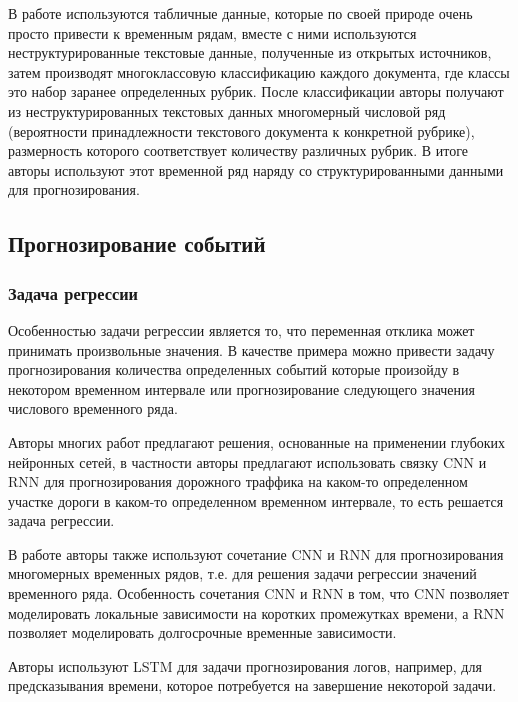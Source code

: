 В работе \cite{struct_unstruct_prediction} используются табличные данные, которые по своей природе очень просто привести к временным рядам, вместе с ними используются неструктурированные текстовые данные, полученные из открытых источников, затем производят многоклассовую классификацию каждого документа, где классы это набор заранее определенных рубрик. После классификации авторы получают из неструктурированных текстовых данных многомерный числовой ряд (вероятности принадлежности текстового документа к конкретной рубрике), размерность которого соответствует количеству различных рубрик. В итоге авторы используют этот временной ряд наряду со структурированными данными для прогнозирования.

\subsection{Прогнозирование событий}
\subsubsection{Задача регрессии}
Особенностью задачи регрессии является то, что переменная отклика может принимать произвольные значения. В качестве примера можно привести задачу прогнозирования количества определенных событий которые произойду в некотором временном интервале или прогнозирование следующего значения числового временного ряда.

Авторы многих работ предлагают решения, основанные на применении глубоких нейронных сетей, в частности авторы \cite{traffic_flow_forecasting} предлагают использовать связку CNN и RNN для прогнозирования дорожного траффика на каком-то определенном участке дороги в каком-то определенном временном интервале, то есть решается задача регрессии.

В работе \cite{modeling_patterns_with_DNN} авторы также используют сочетание CNN и RNN для прогнозирования многомерных временных рядов, т.е. для решения задачи регрессии значений временного ряда. Особенность сочетания CNN и RNN в том, что CNN позволяет моделировать локальные зависимости на коротких промежутках времени, а RNN позволяет моделировать долгосрочные временные зависимости.

Авторы \cite{predictive_monitoring_LSTM} используют LSTM для задачи прогнозирования логов, например, для предсказывания времени, которое потребуется на завершение некоторой задачи.

